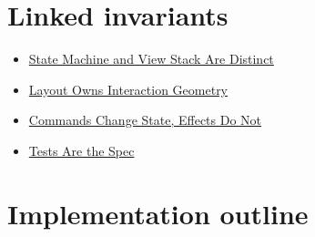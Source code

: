 \section{Linked invariants}\label{record-151-linked-invariants}

\begin{itemize}
\tightlist
\item
  \href{https://github.com/flyingrobots/bijou/blob/cbd70612140e7a450d764b3c7be1c6af878b99bc/docs/invariants/state-machine-and-view-stack-are-distinct.md}{State Machine and View Stack Are Distinct}
\item
  \href{https://github.com/flyingrobots/bijou/blob/cbd70612140e7a450d764b3c7be1c6af878b99bc/docs/invariants/layout-owns-interaction-geometry.md}{Layout Owns Interaction Geometry}
\item
  \href{https://github.com/flyingrobots/bijou/blob/cbd70612140e7a450d764b3c7be1c6af878b99bc/docs/invariants/commands-change-state-effects-do-not.md}{Commands Change State, Effects Do Not}
\item
  \href{https://github.com/flyingrobots/bijou/blob/cbd70612140e7a450d764b3c7be1c6af878b99bc/docs/invariants/tests-are-the-spec.md}{Tests Are the Spec}
\end{itemize}

\section{Implementation outline}\label{record-151-implementation-outline}

